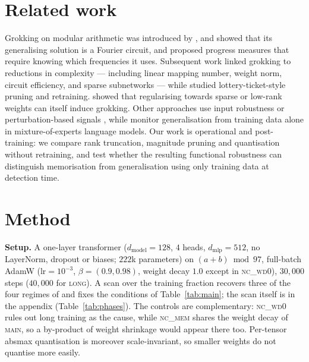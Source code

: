 \documentclass{article}
\begin{document}
\section{Related work}

Grokking on modular arithmetic was introduced by \citet{power2022}, and
\citet{nanda2023progress} showed that its generalising solution is a Fourier circuit, and proposed progress measures that require knowing which
frequencies it uses.
Subsequent work linked grokking to reductions in complexity --- including linear
mapping number, weight norm, circuit efficiency, and sparse subnetworks
\cite{liu2023,liu2023omnigrok,varma2023,merrill2023} ---
while \citet{minegishi2025bridging} studied lottery-ticket-style pruning and
retraining. \citet{junior2025grokking} showed that regularising towards sparse or
low-rank weights can itself induce grokking. Other approaches use input robustness
or perturbation-based signals \cite{tan2024,schiff2021},
while \citet{li2026} monitor generalisation from training data alone in
mixture-of-experts language models.
Our work is operational and post-training: we compare rank truncation, magnitude
pruning and quantisation without retraining, and test whether the resulting
functional robustness can distinguish memorisation from generalisation using only
training data at detection time.

\section{Method}

\textbf{Setup.} A one-layer transformer ($d_{\text{model}}{=}128$, $4$ heads,
$d_{\text{mlp}}{=}512$, no LayerNorm, dropout or biases; $222$k parameters) on
$(a{+}b) \bmod 97$, full-batch AdamW ($\text{lr}{=}10^{-3}$, $\beta{=}(0.9,0.98)$, weight decay $1.0$ except
in \textsc{nc\_wd0}), $30{,}000$ steps ($40{,}000$ for \textsc{long}). A scan over the training fraction recovers three of the four regimes of
\citet{liu2022towards} and fixes the conditions of Table~\ref{tab:main}; the scan itself is in the
appendix (Table~\ref{tab:phases}).
The controls are complementary: \textsc{nc\_wd0} rules out long training as the cause,
while \textsc{nc\_mem} shares the weight decay of \textsc{main}, so a by-product of
weight shrinkage would appear there too. Per-tensor absmax quantisation is moreover
scale-invariant, so smaller weights do not quantise more easily.
\end{document}
